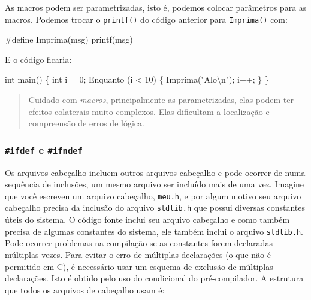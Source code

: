 \documentclass[
]{article}
\newenvironment{Shaded}{}{}
\newcommand{\DataTypeTok}[1]{\textcolor[rgb]{0.56,0.13,0.00}{#1}}
\newcommand{\DecValTok}[1]{\textcolor[rgb]{0.25,0.63,0.44}{#1}}
\newcommand{\NormalTok}[1]{#1}
\newcommand{\PreprocessorTok}[1]{\textcolor[rgb]{0.74,0.48,0.00}{#1}}
\newcommand{\SpecialCharTok}[1]{\textcolor[rgb]{0.25,0.44,0.63}{#1}}
\newcommand{\StringTok}[1]{\textcolor[rgb]{0.25,0.44,0.63}{#1}}
\begin{document}
As macros podem ser parametrizadas, isto é, podemos colocar parâmetros
para as macros. Podemos trocar o \texttt{printf()} do código anterior
para \texttt{Imprima()} com:

\begin{Shaded}
\begin{Highlighting}[]
\PreprocessorTok{#define Imprima(msg) printf(msg)}
\end{Highlighting}
\end{Shaded}

E o código ficaria:

\begin{Shaded}
\begin{Highlighting}[]
\DataTypeTok{int}\NormalTok{ main() \{}
  \DataTypeTok{int}\NormalTok{ i = }\DecValTok{0}\NormalTok{;}
\NormalTok{  Enquanto (i < }\DecValTok{10}\NormalTok{) \{}
\NormalTok{    Imprima(}\StringTok{"Alo}\SpecialCharTok{\textbackslash{}n}\StringTok{"}\NormalTok{);}
\NormalTok{    i++;}
\NormalTok{  \}}
\NormalTok{\}}
\end{Highlighting}
\end{Shaded}

\begin{quote}
Cuidado com \emph{macros}, principalmente as parametrizadas, elas podem
ter efeitos colaterais muito complexos. Elas dificultam a localização e
compreensão de erros de lógica.
\end{quote}

\hypertarget{ifdef-e-ifndef}{%
\subsubsection{\texorpdfstring{\texttt{\#ifdef} e
\texttt{\#ifndef}}{\#ifdef e \#ifndef}}\label{ifdef-e-ifndef}}

Os arquivos cabeçalho incluem outros arquivos cabeçalho e pode ocorrer
de numa sequência de inclusões, um mesmo arquivo ser incluído mais de
uma vez. Imagine que você escreveu um arquivo cabeçalho, \texttt{meu.h},
e por algum motivo seu arquivo cabeçalho precisa da inclusão do arquivo
\texttt{stdlib.h} que possui diversas constantes úteis do sistema. O
código fonte inclui seu arquivo cabeçalho e como também precisa de
algumas constantes do sistema, ele também inclui o arquivo
\texttt{stdlib.h}. Pode ocorrer problemas na compilação se as constantes
forem declaradas múltiplas vezes. Para evitar o erro de múltiplas
declarações (o que não é permitido em C), é necessário usar um esquema
de exclusão de múltiplas declarações. Isto é obtido pelo uso do
condicional do pré-compilador. A estrutura que todos os arquivos de
cabeçalho usam é:
\end{document}
